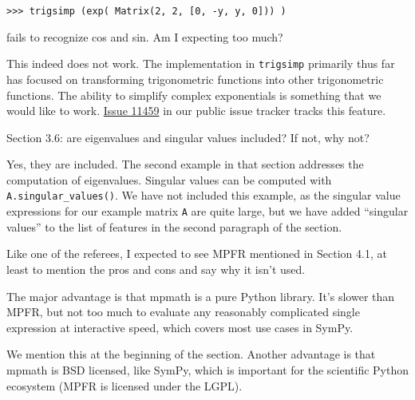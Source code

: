 \documentclass[answers,12pt]{exam}
\begin{document}
\begin{questions}
\begin{verbatim}
>>> trigsimp (exp( Matrix(2, 2, [0, -y, y, 0])) )
\end{verbatim}
fails to recognize cos and
sin. Am I expecting too much?
\begin{solution}
  This indeed does not work. The implementation in \verb|trigsimp| primarily
  thus far has focused on transforming trigonometric functions into other
  trigonometric functions. The ability to simplify complex exponentials is
  something that we would like to work.
  \href{https://github.com/sympy/sympy/issues/11459}{Issue 11459} in our
  public issue tracker tracks this feature.
\end{solution}
\question Section 3.6: are eigenvalues and singular
values included? If not, why not?
\begin{solution}
Yes, they are included.  The second example in that section addresses the computation of
eigenvalues.  Singular values can be computed with
\texttt{A.singular\_values()}. We have not included this example, as the
singular value expressions for our example matrix \texttt{A} are quite large,
but we have added ``singular values'' to the list of features in the second
paragraph of the section.
\end{solution}
\question Like one of the referees, I expected to
see MPFR mentioned in Section 4.1, at least to mention the pros and cons and
say why it isn't used.
\begin{solution}

  The major advantage is that mpmath is a pure Python library. It's slower
  than MPFR, but not too much to evaluate any reasonably complicated single
  expression at interactive speed, which covers most use cases in SymPy.

We mention this at the beginning of the section. Another advantage is that
mpmath is BSD licensed, like SymPy, which is important for the scientific
Python ecosystem (MPFR is licensed under the LGPL).


\end{solution}
\end{questions}
\end{document}
